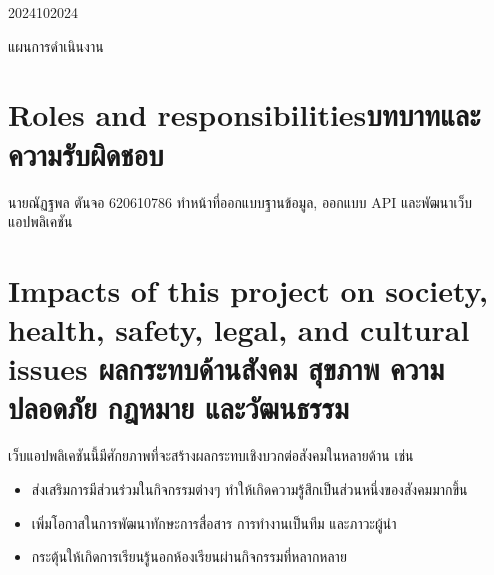 \begin{plan}{6}{2024}{10}{2024}
    \caption[แผนการดำเนินงาน]{แผนการดำเนินงาน}
\end{plan}

\section{\ifenglish Roles and responsibilities\else บทบาทและความรับผิดชอบ\fi}
นายณัฏฐพล ตันจอ 620610786 ทำหน้าที่ออกแบบฐานข้อมูล, ออกแบบ API และพัฒนาเว็บแอปพลิเคชัน
\section{\ifenglish%
Impacts of this project on society, health, safety, legal, and cultural issues
\else%
ผลกระทบด้านสังคม สุขภาพ ความปลอดภัย กฎหมาย และวัฒนธรรม
\fi}

เว็บแอปพลิเคชันนี้มีศักยภาพที่จะสร้างผลกระทบเชิงบวกต่อสังคมในหลายด้าน เช่น 
\begin{itemize}
    \item ส่งเสริมการมีส่วนร่วมในกิจกรรมต่างๆ ทำให้เกิดความรู้สึกเป็นส่วนหนึ่งของสังคมมากขึ้น
    \item เพิ่มโอกาสในการพัฒนาทักษะการสื่อสาร การทำงานเป็นทีม และภาวะผู้นำ
    \item กระตุ้นให้เกิดการเรียนรู้นอกห้องเรียนผ่านกิจกรรมที่หลากหลาย
\end{itemize}
